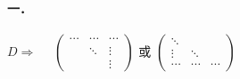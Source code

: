 \documentclass[printbox]{BHCexam}
\begin{document}
\paragraph{一．}
$D \Longrightarrow$　
$\left(\begin{array}{ccc}
  \cdots   & \cdots &\cdots \\
               & \ddots & \vdots \\
                &        &\vdots
\end{array}\right)$
 或
 $
\left(\begin{array}{ccc}
  \ddots    &  &\\
  \vdots           & \ddots &  \\
\cdots            &    \cdots     &\cdots
\end{array}\right)$
\end{document}
